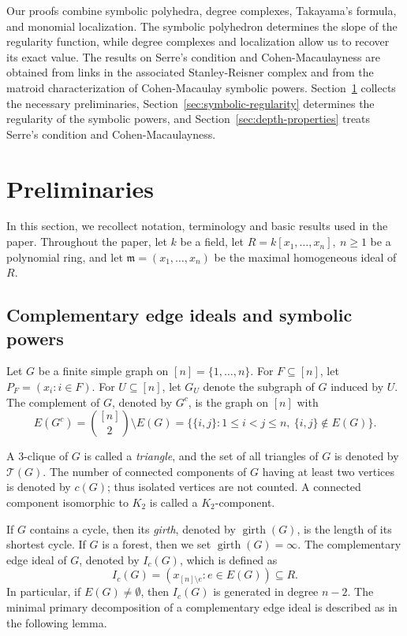 \documentclass[12pt]{amsart}
\def\m {\mathfrak m}
\begin{document}
Our proofs combine symbolic polyhedra, degree complexes, Takayama's formula, and monomial localization. The symbolic polyhedron determines the slope of the regularity function, while degree complexes and localization allow us to recover its exact value. The results on Serre's condition and Cohen-Macaulayness are obtained from links in the associated Stanley-Reisner complex and from the matroid characterization of Cohen-Macaulay symbolic powers. Section~\ref{sec:preliminaries} collects the necessary preliminaries, Section~\ref{sec:symbolic-regularity} determines the regularity of the symbolic powers, and Section~\ref{sec:depth-properties} treats Serre's condition and Cohen-Macaulayness.


\section{Preliminaries}\label{sec:preliminaries}

In this section, we recollect notation, terminology and basic results used in the paper.  Throughout the paper, let $k$ be a field, let $R = k[x_1,\ldots,x_n],\  n\geqslant 1$ be a polynomial ring, and let $\m = (x_1,\ldots,x_n)$ be the maximal homogeneous ideal of $R$.

\subsection{Complementary edge ideals and symbolic powers}

Let \(G\) be a finite simple graph on \([n]=\{1,\ldots,n\}\). For \(F\subseteq[n]\), let \(P_F=(x_i:i\in F).\) For \(U\subseteq[n]\), let \(G_U\) denote the subgraph of \(G\) induced by \(U\). The complement of \(G\), denoted by \(G^c\), is the graph on \([n]\) with 
\[ E(G^c)=\binom{[n]}2\setminus E(G) =\bigl\{\{i,j\}:1\leq i<j\leq n,\ \{i,j\}\notin E(G)\bigr\}.\]

A \(3\)-clique of \(G\) is called a \emph{triangle}, and the set of all triangles of \(G\) is denoted by \(\mathcal T(G)\). The number of connected components of \(G\) having at least two vertices is denoted by \(c(G)\); thus isolated vertices are not counted. A connected component isomorphic to \(K_2\) is called a \(K_2\)-component.

If \(G\) contains a cycle, then its \emph{girth}, denoted by \(\operatorname{girth}(G)\), is the length of its shortest cycle. If \(G\) is a forest, then we set \(\operatorname{girth}(G)=\infty\). The complementary edge ideal of \(G\), denoted by \(I_c(G)\), which is defined as
\[
I_c(G) =\left(x_{[n]\setminus e}:e\in E(G)\right)\subseteq R.
\]
In particular, if \(E(G)\ne\emptyset\), then \(I_c(G)\) is generated in degree \(n-2\). The minimal primary decomposition of a complementary edge ideal is described as in the following lemma.
\end{document}
